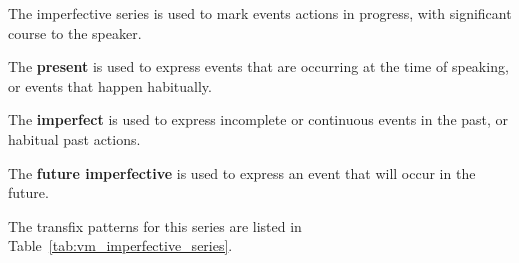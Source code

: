 \documentclass[grammar]{subfiles}
\begin{document}
  The imperfective series is used to mark events actions in progress, with significant course to the speaker. 

  \begin{itemize*}
    \item The \textbf{present} is used to express events that are occurring at the time of speaking, or events that happen habitually. 
    \item The \textbf{imperfect} is used to express incomplete or continuous events in the past, or habitual past actions. 
    \item The \textbf{future imperfective} is used to express an event that will occur in the future. 
  \end{itemize*}

  The transfix patterns for this series are listed in Table~\ref{tab:vm_imperfective_series}. 
\end{document}
